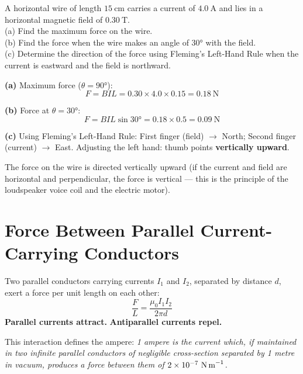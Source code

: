 \begin{examplebox}[25.2]
A horizontal wire of length $15\ \text{cm}$ carries
a current of $4.0\ \text{A}$ and lies in a horizontal
magnetic field of $0.30\ \text{T}$.\\
(a) Find the maximum force on the wire.\\
(b) Find the force when the wire makes an angle
of $30°$ with the field.\\
(c) Determine the direction of the force using
Fleming's Left-Hand Rule when the current is
eastward and the field is northward.
\end{examplebox}

\begin{solutionbox}
\textbf{(a)} Maximum force ($\theta = 90°$):
\[
  F = BIL = 0.30 \times 4.0 \times 0.15
  = 0.18\ \text{N}
\]

\textbf{(b)} Force at $\theta = 30°$:
\[
  F = BIL\sin 30° = 0.18 \times 0.5 = 0.09\ \text{N}
\]

\textbf{(c)} Using Fleming's Left-Hand Rule:
First finger (field) $\to$ North;
Second finger (current) $\to$ East.
Adjusting the left hand: thumb points
\textbf{vertically upward}.

The force on the wire is directed vertically upward
(if the current and field are horizontal and
perpendicular, the force is vertical --- this is
the principle of the loudspeaker voice coil and
the electric motor).
\end{solutionbox}

\section{Force Between Parallel Current-Carrying
Conductors}

\begin{lawbox}
Two parallel conductors carrying currents $I_1$ and
$I_2$, separated by distance $d$, exert a force per
unit length on each other:
\[
  \frac{F}{L} = \frac{\mu_0 I_1 I_2}{2\pi d}
\]
\textbf{Parallel currents attract.}
\textbf{Antiparallel currents repel.}

This interaction defines the ampere:
\textit{1 ampere is the current which, if maintained
in two infinite parallel conductors of negligible
cross-section separated by 1 metre in vacuum,
produces a force between them of
$2\times10^{-7}\ \text{N\,m}^{-1}$.}
\end{lawbox}

